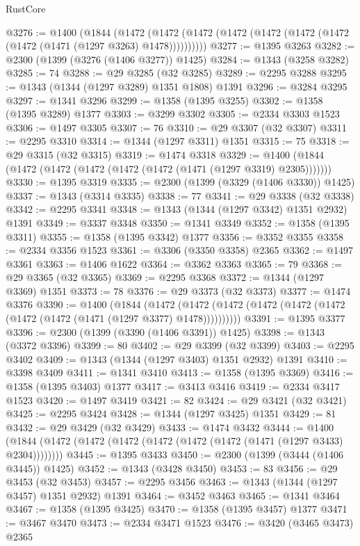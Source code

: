 \begin{lexlean}{RustCore}
\begin{coremodule}
@3276 := @1400
    (@1844
      (@1472 (@1472 (@1472 (@1472 (@1472 (@1472 (@1472 (@1472 (@1471 (@1297 @3263) @1478))))))))))
@3277 := @1395 @3263
@3282 := @2300 (@1399 (@3276 (@1406 @3277)) @1425)
@3284 := @1343 (@3258 @3282)
@3285 := 74
@3288 := @29 @3285 (@32 @3285)
@3289 := @2295 @3288
@3295 := @1343 (@1344 (@1297 @3289) @1351 @1808) @1391
@3296 := @3284 @3295
@3297 := @1341 @3296
@3299 := @1358 (@1395 @3255)
@3302 := @1358 (@1395 @3289) @1377
@3303 := @3299 @3302
@3305 := @2334 @3303 @1523
@3306 := @1497 @3305
@3307 := 76
@3310 := @29 @3307 (@32 @3307)
@3311 := @2295 @3310
@3314 := @1344 (@1297 @3311) @1351
@3315 := 75
@3318 := @29 @3315 (@32 @3315)
@3319 := @1474 @3318
@3329 := @1400 (@1844 (@1472 (@1472 (@1472 (@1472 (@1472 (@1471 (@1297 @3319) @2305)))))))
@3330 := @1395 @3319
@3335 := @2300 (@1399 (@3329 (@1406 @3330)) @1425)
@3337 := @1343 (@3314 @3335)
@3338 := 77
@3341 := @29 @3338 (@32 @3338)
@3342 := @2295 @3341
@3348 := @1343 (@1344 (@1297 @3342) @1351 @2932) @1391
@3349 := @3337 @3348
@3350 := @1341 @3349
@3352 := @1358 (@1395 @3311)
@3355 := @1358 (@1395 @3342) @1377
@3356 := @3352 @3355
@3358 := @2334 @3356 @1523
@3361 := @3306 (@3350 @3358) @2365
@3362 := @1497 @3361
@3363 := @1406 @1622
@3364 := @3362 @3363
@3365 := 79
@3368 := @29 @3365 (@32 @3365)
@3369 := @2295 @3368
@3372 := @1344 (@1297 @3369) @1351
@3373 := 78
@3376 := @29 @3373 (@32 @3373)
@3377 := @1474 @3376
@3390 := @1400
    (@1844
      (@1472 (@1472 (@1472 (@1472 (@1472 (@1472 (@1472 (@1472 (@1471 (@1297 @3377) @1478))))))))))
@3391 := @1395 @3377
@3396 := @2300 (@1399 (@3390 (@1406 @3391)) @1425)
@3398 := @1343 (@3372 @3396)
@3399 := 80
@3402 := @29 @3399 (@32 @3399)
@3403 := @2295 @3402
@3409 := @1343 (@1344 (@1297 @3403) @1351 @2932) @1391
@3410 := @3398 @3409
@3411 := @1341 @3410
@3413 := @1358 (@1395 @3369)
@3416 := @1358 (@1395 @3403) @1377
@3417 := @3413 @3416
@3419 := @2334 @3417 @1523
@3420 := @1497 @3419
@3421 := 82
@3424 := @29 @3421 (@32 @3421)
@3425 := @2295 @3424
@3428 := @1344 (@1297 @3425) @1351
@3429 := 81
@3432 := @29 @3429 (@32 @3429)
@3433 := @1474 @3432
@3444 := @1400 (@1844 (@1472 (@1472 (@1472 (@1472 (@1472 (@1472 (@1471 (@1297 @3433) @2304))))))))
@3445 := @1395 @3433
@3450 := @2300 (@1399 (@3444 (@1406 @3445)) @1425)
@3452 := @1343 (@3428 @3450)
@3453 := 83
@3456 := @29 @3453 (@32 @3453)
@3457 := @2295 @3456
@3463 := @1343 (@1344 (@1297 @3457) @1351 @2932) @1391
@3464 := @3452 @3463
@3465 := @1341 @3464
@3467 := @1358 (@1395 @3425)
@3470 := @1358 (@1395 @3457) @1377
@3471 := @3467 @3470
@3473 := @2334 @3471 @1523
@3476 := @3420 (@3465 @3473) @2365

\end{coremodule}
\end{lexlean}
